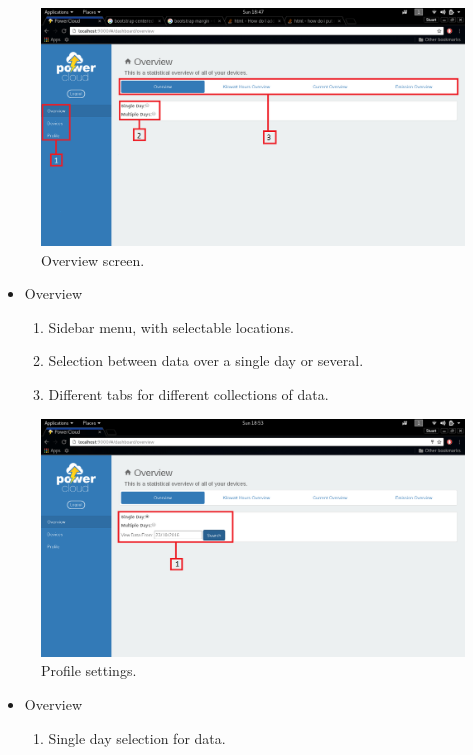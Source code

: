 \documentclass[a4paper,10pt]{article}
\begin{document}
		\begin{figure}[H]
			\includegraphics[width=\textwidth]{images/Overview_general.png}
			\caption{Overview screen. \label{overflow}}
		\end{figure}
		\begin{itemize}
			\item Overview
			\begin{enumerate}
				\item Sidebar menu, with selectable locations.
				\item Selection between data over a single day or several.
				\item Different tabs for different collections of data.
			\end{enumerate}
		\end{itemize}
		
		\begin{figure}[H]
			\includegraphics[width=\textwidth]{images/Overview_single_day.png}
			\caption{Profile settings. \label{overflow}}
		\end{figure}
		\begin{itemize}
			\item Overview
			\begin{enumerate}
				\item Single day selection for data.
			\end{enumerate}
		\end{itemize}
		
\end{document}
